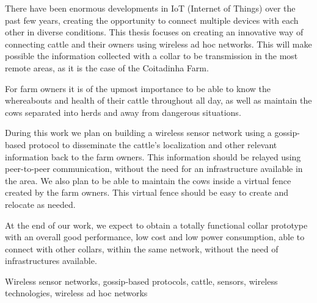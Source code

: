 
%

There have been enormous developments in IoT (Internet of Things) over the past few years,
creating the opportunity to connect multiple devices with each other in diverse conditions.
This thesis focuses on creating an innovative way of connecting cattle and their owners
using wireless ad hoc networks. This will make possible the information collected with a
collar to be transmission in the most remote areas, as it is the case of the Coitadinha
Farm.

For farm owners it is of the upmost importance to be able to know the whereabouts and health
of their cattle throughout all day, as well as maintain the cows separated into herds and
away from dangerous situations.

During this work we plan on building a wireless sensor network using a gossip-based protocol
to disseminate the cattle's localization and other relevant information back to the farm owners.
This information should be relayed using peer-to-peer communication, without the need for an
infrastructure available in the area. We also plan to be able to
maintain the cows inside a virtual fence created by the farm owners. This virtual fence should
be easy to create and relocate as needed.

At the end of our work, we expect to obtain a totally functional collar prototype with an
overall good performance, low cost and low power consumption, able to connect with other collars,
within the same network, without the need of infrastructures available.

\begin{keywords}
    Wireless sensor networks, gossip-based protocols, cattle, sensors, wireless technologies,
    wireless ad hoc networks
\end{keywords}
